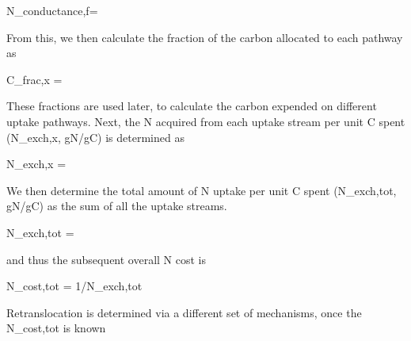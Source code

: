 \documentclass[draft,linenumbers]{agujournal}
\begin{document}
N_{conductance,f}=  

From this, we then calculate the fraction of the carbon allocated to each pathway as

C_{frac,x} = 

These fractions are used later, to calculate the carbon expended on different uptake pathways. Next, the N acquired from each uptake stream per unit C spent (N_{exch,x}, gN/gC) is determined as

N_{exch,x} = 

We then determine the total amount of N uptake per unit C spent (N_{exch,tot}, gN/gC) as the sum of all the uptake streams.

N_{exch,tot} = 

and thus the subsequent overall N cost is

N_{cost,tot} = 1/{N_{exch,tot}}

Retranslocation is determined via a different set of mechanisms, once the N_{cost,tot} is known
\end{document}
